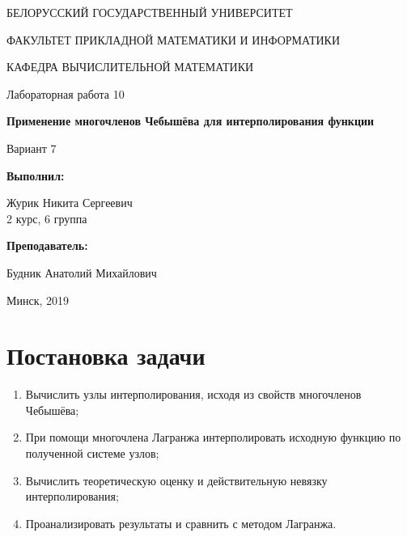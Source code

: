 \documentclass[14pt, a4paper]{article}
\begin{document}
\begin{titlepage}
\begin{center}
\large{БЕЛОРУССКИЙ ГОСУДАРСТВЕННЫЙ УНИВЕРСИТЕТ 

ФАКУЛЬТЕТ ПРИКЛАДНОЙ МАТЕМАТИКИ И ИНФОРМАТИКИ

КАФЕДРА ВЫЧИСЛИТЕЛЬНОЙ МАТЕМАТИКИ}
\end{center}
\vspace*{\fill}
\begin{center}
Лабораторная работа 10

\large{\textbf{Применение многочленов Чебышёва для интерполирования функции}}

Вариант 7
\end{center}
\begin{flushright}
\textbf{Выполнил:}

Журик Никита Сергеевич \\ 2 курс, 6 группа

\textbf{Преподаватель:}

Будник Анатолий Михайлович
\end{flushright}
\vspace*{\fill}
\begin{center}
Минск, 2019
\end{center}
\end{titlepage}

\tableofcontents
\newpage

\newpage
{}

  \section{Постановка задачи}
    \begin{enumerate}
      \item
      Вычислить узлы интерполирования, исходя из свойств многочленов Чебышёва;
      \item
      При помощи многочлена Лагранжа интерполировать исходную функцию по полученной системе узлов;
      \item
      Вычислить теоретическую оценку и действительную невязку интерполирования;
      \item
      Проанализировать результаты и сравнить с методом Лагранжа.
    \end{enumerate}
\end{document}
